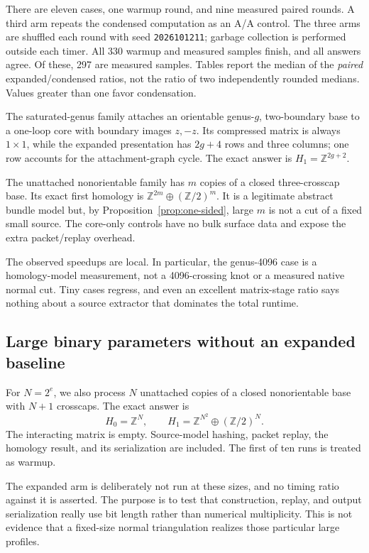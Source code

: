 \documentclass[11pt]{article}
\theoremstyle{definition}
\theoremstyle{remark}
\newcommand{\Z}{\mathbb Z}
\newcommand{\code}[1]{\texttt{#1}}
\begin{document}
There are eleven cases, one warmup round, and nine measured paired rounds.
A third arm repeats the condensed computation as an A/A control. The three
arms are shuffled each round with seed \code{2026101211}; garbage collection
is performed outside each timer. All 330 warmup and measured samples finish,
and all answers agree. Of these, 297 are measured samples. Tables report the
median of the \emph{paired} expanded/condensed ratios, not the ratio of two
independently rounded medians. Values greater than one favor condensation.



The saturated-genus family attaches an orientable genus-$g$, two-boundary
base to a one-loop core with boundary images $z,-z$. Its compressed matrix
is always $1\times1$, while the expanded presentation has $2g+4$ rows and
three columns; one row accounts for the attachment-graph cycle. The exact
answer is $H_1=\Z^{2g+2}$.

The unattached nonorientable family has $m$ copies of a closed three-crosscap
base. Its exact first homology is $\Z^{2m}\oplus(\Z/2)^m$. It is a legitimate
abstract bundle model but, by Proposition~\ref{prop:one-sided}, large $m$
is not a cut of a fixed small source. The core-only controls have no bulk
surface data and expose the extra packet/replay overhead.

The observed speedups are local. In particular, the genus-4096 case is a
homology-model measurement, not a 4096-crossing knot or a measured native
normal cut. Tiny cases regress, and even an excellent matrix-stage ratio
says nothing about a source extractor that dominates the total runtime.

\subsection{Large binary parameters without an expanded baseline}
For $N=2^e$, we also process $N$ unattached copies of a closed nonorientable
base with $N+1$ crosscaps. The exact answer is
\[
 H_0=\Z^N,\qquad H_1=\Z^{N^2}\oplus(\Z/2)^N.
\]
The interacting matrix is empty. Source-model hashing, packet replay, the
homology result, and its serialization are included. The first of ten runs
is treated as warmup.



The expanded arm is deliberately not run at these sizes, and no timing
ratio against it is asserted. The purpose is to test that construction,
replay, and output serialization really use bit length rather than numerical
multiplicity. This is not evidence that a fixed-size normal triangulation
realizes those particular large profiles.
\end{document}
